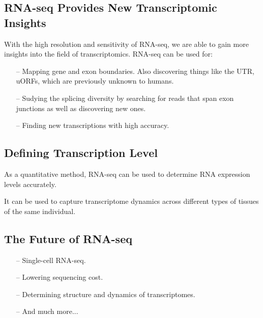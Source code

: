 \documentclass[a4paper,12pt]{article}
\begin{document}

\subsection{RNA-seq Provides New Transcriptomic Insights}
With the high resolution and sensitivity of RNA-seq, we are able to gain more insights into the field of transcriptomics. RNA-seq can be used for:
\begin{itemize}
	\item [--]Mapping gene and exon boundaries. Also discovering things like the UTR, uORFs, which are previously unknown to humans.
	\item [--]Sudying the splicing diversity by searching for reads that span exon junctions as well as discovering new ones.
	\item [--]Finding new transcriptions with high accuracy.
\end{itemize}

\subsection{Defining Transcription Level}
As a quantitative method, RNA-seq can be used to determine RNA expression levels accurately.

It can be used to capture transcriptome dynamics across different types of tissues of the same individual.

\subsection{The Future of RNA-seq}
\begin{itemize}
	\item [--]Single-cell RNA-seq.
	\item [--]Lowering sequencing cost.
	\item [--] Determining structure and dynamics of transcriptomes.
	\item [--] And much more...
\end{itemize}

\vspace{20mm}

\end{document}
